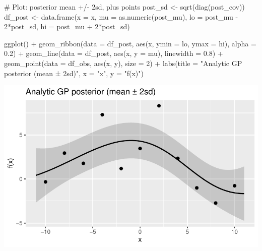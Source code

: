 \documentclass[
  letterpaper,
  DIV=11,
  numbers=noendperiod]{scrartcl}
\newenvironment{Shaded}{\begin{snugshade}}{\end{snugshade}}
\newcommand{\AttributeTok}[1]{\textcolor[rgb]{0.40,0.45,0.13}{#1}}
\newcommand{\CommentTok}[1]{\textcolor[rgb]{0.37,0.37,0.37}{#1}}
\newcommand{\DecValTok}[1]{\textcolor[rgb]{0.68,0.00,0.00}{#1}}
\newcommand{\FloatTok}[1]{\textcolor[rgb]{0.68,0.00,0.00}{#1}}
\newcommand{\FunctionTok}[1]{\textcolor[rgb]{0.28,0.35,0.67}{#1}}
\newcommand{\NormalTok}[1]{\textcolor[rgb]{0.00,0.23,0.31}{#1}}
\newcommand{\OtherTok}[1]{\textcolor[rgb]{0.00,0.23,0.31}{#1}}
\newcommand{\SpecialCharTok}[1]{\textcolor[rgb]{0.37,0.37,0.37}{#1}}
\newcommand{\StringTok}[1]{\textcolor[rgb]{0.13,0.47,0.30}{#1}}
\begin{document}
\begin{Shaded}
\begin{Highlighting}[]
\CommentTok{\# Plot: posterior mean +/{-} 2sd, plus points}
\NormalTok{post\_sd }\OtherTok{\textless{}{-}} \FunctionTok{sqrt}\NormalTok{(}\FunctionTok{diag}\NormalTok{(post\_cov))}
\NormalTok{df\_post }\OtherTok{\textless{}{-}} \FunctionTok{data.frame}\NormalTok{(}\AttributeTok{x =}\NormalTok{ x, }\AttributeTok{mu =} \FunctionTok{as.numeric}\NormalTok{(post\_mu), }\AttributeTok{lo =}\NormalTok{ post\_mu }\SpecialCharTok{{-}} \DecValTok{2}\SpecialCharTok{*}\NormalTok{post\_sd, }\AttributeTok{hi =}\NormalTok{ post\_mu }\SpecialCharTok{+} \DecValTok{2}\SpecialCharTok{*}\NormalTok{post\_sd)}

\FunctionTok{ggplot}\NormalTok{() }\SpecialCharTok{+}
  \FunctionTok{geom\_ribbon}\NormalTok{(}\AttributeTok{data =}\NormalTok{ df\_post, }\FunctionTok{aes}\NormalTok{(x, }\AttributeTok{ymin =}\NormalTok{ lo, }\AttributeTok{ymax =}\NormalTok{ hi), }\AttributeTok{alpha =} \FloatTok{0.2}\NormalTok{) }\SpecialCharTok{+}
  \FunctionTok{geom\_line}\NormalTok{(}\AttributeTok{data =}\NormalTok{ df\_post, }\FunctionTok{aes}\NormalTok{(x, }\AttributeTok{y =}\NormalTok{ mu), }\AttributeTok{linewidth =} \FloatTok{0.8}\NormalTok{) }\SpecialCharTok{+}
  \FunctionTok{geom\_point}\NormalTok{(}\AttributeTok{data =}\NormalTok{ df\_obs, }\FunctionTok{aes}\NormalTok{(x, y), }\AttributeTok{size =} \DecValTok{2}\NormalTok{) }\SpecialCharTok{+}
  \FunctionTok{labs}\NormalTok{(}\AttributeTok{title =} \StringTok{"Analytic GP posterior (mean ± 2sd)"}\NormalTok{,}
       \AttributeTok{x =} \StringTok{"x"}\NormalTok{, }\AttributeTok{y =} \StringTok{"f(x)"}\NormalTok{)}
\end{Highlighting}
\end{Shaded}

\includegraphics{GP-simulation-+-inference_files/figure-pdf/unnamed-chunk-4-1.pdf}
\end{document}
